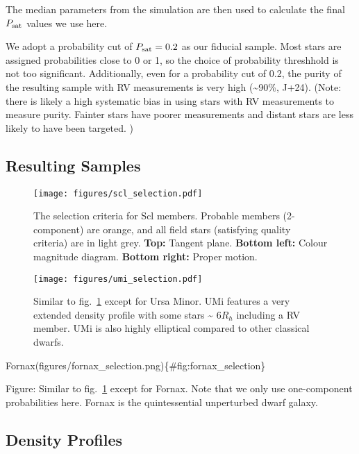 The median parameters from the simulation are then used to calculate the
final \(P_{\rm sat}\) values we use here.

We adopt a probability cut of \(P_{\rm sat} = 0.2\) as our fiducial
sample. Most stars are assigned probabilities close to 0 or 1, so the
choice of probability threshhold is not too significant. Additionally,
even for a probability cut of 0.2, the purity of the resulting sample
with RV measurements is very high (\textasciitilde90\%, J+24). (Note:
there is likely a high systematic bias in using stars with RV
measurements to measure purity. Fainter stars have poorer measurements
and distant stars are less likely to have been targeted. )

\subsection{Resulting Samples}\label{resulting-samples}

\begin{figure}
\centering
\texttt{[image: figures/scl\_selection.pdf]}
\caption[Sculptor selection criteria]{The selection criteria for Scl
members. Probable members (2-component) are orange, and all field stars
(satisfying quality criteria) are in light grey. \textbf{Top:} Tangent
plane. \textbf{Bottom left:} Colour magnitude diagram. \textbf{Bottom
right:} Proper motion.}\label{fig:sculptor_selection}
\end{figure}

\begin{figure}
\centering
\texttt{[image: figures/umi\_selection.pdf]}
\caption[Ursa Minor Selection]{Similar to
fig.~\ref{fig:sculptor_selection} except for Ursa Minor. UMi features a
very extended density profile with some stars \textasciitilde{} 6\(R_h\)
including a RV member. UMi is also highly elliptical compared to other
classical dwarfs.}\label{fig:umi_selection}
\end{figure}

Fornax(figures/fornax\_selection.png)\{\#fig:fornax\_selection\}

Figure: Similar to fig.~\ref{fig:sculptor_selection} except for Fornax.
Note that we only use one-component probabilities here. Fornax is the
quintessential unperturbed dwarf galaxy.

\subsection{Density Profiles}\label{density-profiles}

